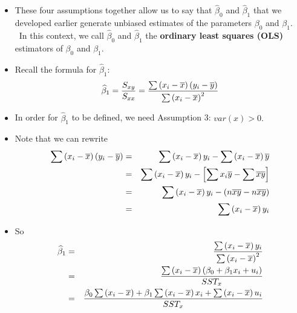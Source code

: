 \documentclass[11pt]{article}
\begin{document}
\begin{itemize}
\item These four assumptions together allow us to say that $\widehat{\beta }%
_{0}$ and $\widehat{\beta }_{1}$ that we developed earlier generate unbiased
estimates of the parameters $\beta _{0}$ and $\beta _{1}.$ \ In this
context, we call $\widehat{\beta }_{0}$ and $\widehat{\beta }_{1}$ the 
\textbf{ordinary least squares (OLS) }estimators of $\beta _{0}$ and $\beta
_{1}.$

\item Recall the formula for $\widehat{\beta }_{1}:$ 
\begin{equation*}
\widehat{\beta }_{1}=\frac{S_{xy}}{S_{xx}}=\frac{\sum \left( x_{i}-\overline{%
x}\right) \left( y_{i}-\overline{y}\right) }{\sum \left( x_{i}-\overline{x}%
\right) ^{2}}
\end{equation*}

\item In order for $\widehat{\beta }_{1}$ to be defined, we need Assumption
3: $var\left( x\right) >0.$

\item Note that we can rewrite%
\begin{eqnarray*}
\sum \left( x_{i}-\overline{x}\right) \left( y_{i}-\overline{y}\right)
&=&\sum \left( x_{i}-\overline{x}\right) y_{i}-\sum \left( x_{i}-\overline{x}%
\right) \overline{y} \\
&=&\sum \left( x_{i}-\overline{x}\right) y_{i}-\left[ \sum x_{i}\overline{y}%
-\sum \overline{x}\overline{y}\right] \\
&=&\sum \left( x_{i}-\overline{x}\right) y_{i}-\left( n\overline{x}\overline{%
y}-n\overline{x}\overline{y}\right) \\
&=&\sum \left( x_{i}-\overline{x}\right) y_{i}
\end{eqnarray*}

\item So%
\begin{eqnarray*}
\widehat{\beta }_{1} &=&\frac{\sum \left( x_{i}-\overline{x}\right) y_{i}}{%
\sum \left( x_{i}-\overline{x}\right) ^{2}} \\
&=&\frac{\sum \left( x_{i}-\overline{x}\right) \left( \beta _{0}+\beta
_{1}x_{i}+u_{i}\right) }{SST_{x}} \\
&=&\frac{\beta _{0}\sum \left( x_{i}-\overline{x}\right) +\beta _{1}\sum
\left( x_{i}-\overline{x}\right) x_{i}+\sum \left( x_{i}-\overline{x}\right)
u_{i}}{SST_{x}}
\end{eqnarray*}


\end{itemize}
\end{document}
